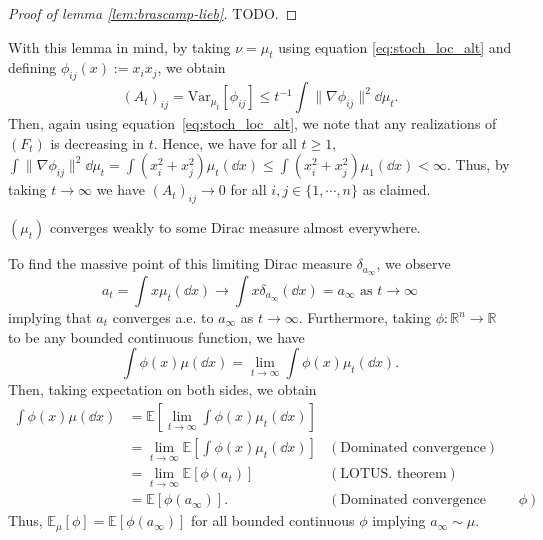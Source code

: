 \begin{proof}[Proof of lemma \ref{lem:brascamp-lieb}]
  TODO.
\end{proof}

With this lemma in mind, by taking \(\nu = \mu_t\) using equation \ref{eq:stoch_loc_alt} and defining
\(\phi_{ij}(x) := x_i x_j\), we obtain
\[(A_t)_{ij} = \text{Var}_{\mu_t}[\phi_{ij}] \le t^{-1} \int \|\nabla \phi_{ij}\|^2 \dd \mu_t.\]
Then, again using equation~\ref{eq:stoch_loc_alt}, we note that any realizations of \((F_t)\) is decreasing 
in \(t\). Hence, we have for all \(t \ge 1\), \(\int \|\nabla \phi_{ij}\|^2 \dd \mu_t = 
\int (x_i^2 + x_j^2) \mu_t(\dd x) \le \int (x_i^2 + x_j^2) \mu_1 (\dd x) < \infty\). Thus, by 
taking \(t \to \infty\) we have \((A_t)_{ij} \to 0\) for all \(i, j \in \{1, \cdots, n\}\) as claimed.

\begin{corollary}
  \((\mu_t)\) converges weakly to some Dirac measure almost everywhere.
\end{corollary}

To find the massive point of this limiting Dirac measure \(\delta_{a_\infty}\), we observe 
\[a_t = \int x \mu_t(\dd x) \to \int x \delta_{a_\infty}(\dd x) = a_\infty \text{ as } t \to \infty\]
implying that \(a_t\) converges a.e. to \(a_\infty\) as \(t \to \infty\). Furthermore, 
taking \(\phi : \mathbb{R}^n \to \mathbb{R}\) to be any bounded continuous function, we have
\[\int \phi(x) \mu(\dd x) = \lim_{t \to \infty} \int \phi(x) \mu_t(\dd x).\]
Then, taking expectation on both sides, we obtain
\begin{align*}
  \int \phi(x) \mu(\dd x) & = \mathbb{E}\left[\lim_{t \to \infty} \int \phi(x) \mu_t(\dd x)\right] & \\
  & = \lim_{t \to \infty} \mathbb{E}\left[\int \phi(x) \mu_t(\dd x)\right] & (\text{Dominated convergence})\\
  & = \lim_{t \to \infty} \mathbb{E}[\phi(a_t)] & (\text{LOTUS. theorem})\\
  & = \mathbb{E}[\phi(a_\infty)]. & (\text{Dominated convergence \& continuity of } \phi)
\end{align*}
Thus, \(\mathbb{E}_\mu[\phi] = \mathbb{E}[\phi(a_\infty)]\) for all bounded continuous \(\phi\) implying 
\(a_\infty \sim \mu\).

